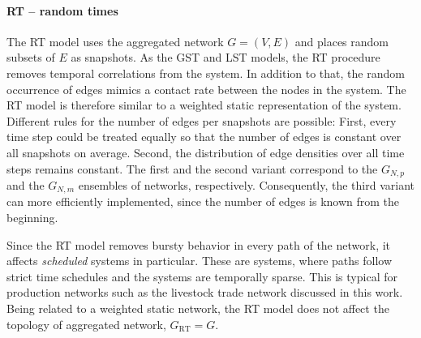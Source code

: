 \paragraph{RT -- random times\color{Cayenne}{.}}
The RT model uses the aggregated network $G=(V,E)$ and places random subsets of $E$ as snapshots.
As the GST and LST models, the RT procedure removes temporal correlations from the system.
In addition to that, the random occurrence of edges mimics a contact rate between the nodes in the system.
The RT model is therefore similar to a weighted static representation of the system.
Different rules for the number of edges per snapshots are possible:
First, every time step could be treated equally so that the number of edges is constant over all snapshots on average.
Second, the distribution of edge densities over all time steps remains constant.
The first and the second variant correspond to the $G_{N,p}$ and the $G_{N,m}$ ensembles of \ER networks, respectively.
Consequently, the third variant can more efficiently implemented, since the number of edges is known from the beginning.

Since the RT model removes bursty behavior in every path of the network, it affects \emph{scheduled} systems in particular.
These are systems, where paths follow strict time schedules and the systems are temporally sparse.
This is typical for production networks such as the livestock trade network discussed in this work.
Being related to a weighted static network, the RT model does not affect the topology of aggregated network, $G_\mathrm{RT}=G$.

